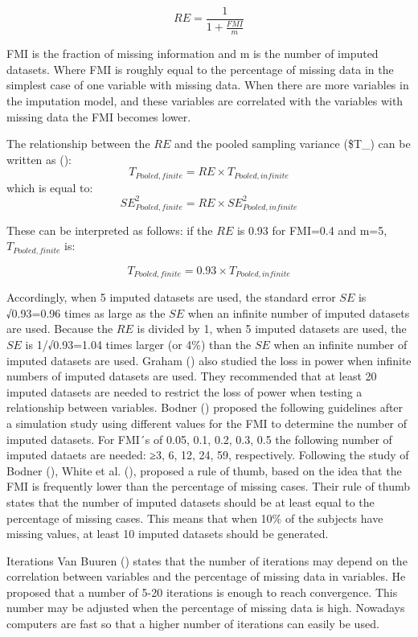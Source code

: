 \documentclass[]{book}
\begin{document}
\[RE=  \frac{1}{1+ \frac{FMI}{m}}\]

FMI is the fraction of missing information and m is the number of
imputed datasets. Where FMI is roughly equal to the percentage of
missing data in the simplest case of one variable with missing data.
When there are more variables in the imputation model, and these
variables are correlated with the variables with missing data the FMI
becomes lower.

The relationship between the \(RE\) and the pooled sampling variance
(\$T\_) can be written as (\citet{VanBuuren2018}):
\[T_{Pooled,finite}=RE×T_{Pooled,infinite}\] which is equal to:
\[SE_{Pooled,finite}^2=RE×SE_{Pooled,infinite}^2 \]

These can be interpreted as follows: if the \(RE\) is 0.93 for FMI=0.4
and m=5, \(T_{Pooled,finite}\) is:

\[T_{Pooled,finite}=0.93×T_{Pooled,infinite}\]

Accordingly, when 5 imputed datasets are used, the standard error \(SE\)
is √0.93=0.96 times as large as the \(SE\) when an infinite number of
imputed datasets are used. Because the \(RE\) is divided by 1, when 5
imputed datasets are used, the \(SE\) is 1/√0.93=1.04 times larger (or
4\%) than the \(SE\) when an infinite number of imputed datasets are
used. Graham (\citet{Graham2007}) also studied the loss in power when
infinite numbers of imputed datasets are used. They recommended that at
least 20 imputed datasets are needed to restrict the loss of power when
testing a relationship between variables. Bodner (\citet{Bodner2008})
proposed the following guidelines after a simulation study using
different values for the FMI to determine the number of imputed
datasets. For FMI´s of 0.05, 0.1, 0.2, 0.3, 0.5 the following number of
imputed dataets are needed: ≥3, 6, 12, 24, 59, respectively. Following
the study of Bodner (\citet{Bodner2008}), White et al.
(\citet{White2011}), proposed a rule of thumb, based on the idea that
the FMI is frequently lower than the percentage of missing cases. Their
rule of thumb states that the number of imputed datasets should be at
least equal to the percentage of missing cases. This means that when
10\% of the subjects have missing values, at least 10 imputed datasets
should be generated.

Iterations Van Buuren (\citet{VanBuuren2018}) states that the number of
iterations may depend on the correlation between variables and the
percentage of missing data in variables. He proposed that a number of
5-20 iterations is enough to reach convergence. This number may be
adjusted when the percentage of missing data is high. Nowadays computers
are fast so that a higher number of iterations can easily be used.
\end{document}
